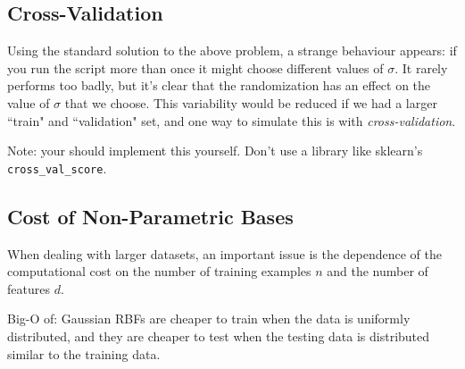 \documentclass{article}
\begin{document}
\subsection{Cross-Validation}

Using the standard solution to the above problem, a strange behaviour appears: 
if you run the script more than once it might choose different values of $\sigma$. 
It rarely performs too badly, but it's clear that the randomization has an effect 
on the value of $\sigma$ that we choose. This variability would be reduced if we
had a larger ``train" and ``validation" set, and one way to simulate this is 
with \emph{cross-validation}. 

Note: your should implement this yourself. Don't use a library like sklearn's \verb|cross_val_score|.


\subsection{Cost of Non-Parametric Bases}

When dealing with larger datasets, an important issue is the dependence of the
computational cost on the number of training examples $n$ and the number of
features $d$. 

 Big-O of:
Gaussian RBFs are cheaper to train when the data is uniformly distributed, and they are cheaper to test when the testing data is distributed similar to the training data.
\end{document}
